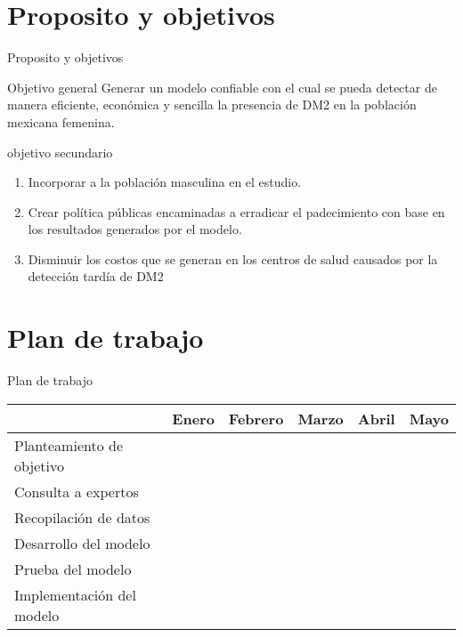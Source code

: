 \documentclass[pdf]{beamer}
\begin{document}
\section{Proposito y objetivos}
\begin{frame}{Proposito y objetivos}
\begin{block}{Objetivo general}
Generar un modelo confiable con el cual se pueda detectar de manera eficiente, econ\'omica y sencilla la presencia de DM2 en la población mexicana femenina.
\end{block}

\begin{block}{objetivo secundario}
\begin{enumerate}
	\item Incorporar a la poblaci\'on masculina en el estudio.
	\item Crear política públicas encaminadas a erradicar el padecimiento con base en los resultados generados por el modelo.
	\item Disminuir los costos que se generan en los centros de salud causados por la detecci\'on tard\'ia de DM2
\end{enumerate}
\end{block}
\end{frame}

\section{Plan de trabajo}
\begin{frame}{Plan de trabajo}

\begin{tabular}{|l|l|l|l|l|l|}
\hline
&Enero&Febrero&Marzo&Abril&Mayo\\ \hline \hline
Planteamiento de objetivo&\cellcolor{blue}&&&&\\ \hline
Consulta a expertos&\cellcolor{blue}&&&&\\ \hline
Recopilación de datos&&\cellcolor{blue}&\cellcolor{blue}&&\\ \hline
Desarrollo del modelo&&&\cellcolor{blue}&\cellcolor{blue}&\\ \hline
Prueba del modelo&&&&\cellcolor{blue}&\cellcolor{blue}\\ \hline
Implementaci\'on del modelo&&&&&\cellcolor{blue}\\ \hline
\end{tabular}

\end{frame}
\end{document}
